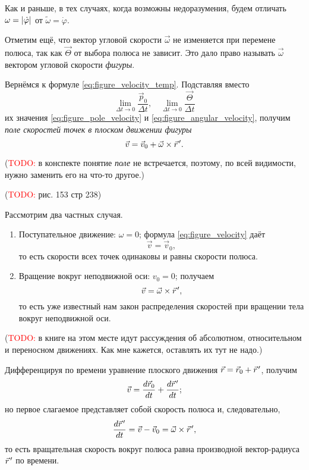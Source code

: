 Как и раньше, в тех случаях, когда возможны недоразумения, будем отличать
$\omega = \left|\dot{\varphi}\right|$ от $\tilde{\omega} = \dot{\varphi}$.

Отметим ещё, что вектор угловой скорости $\vec{\omega}$ не изменяется при
перемене полюса, так как $\vec{\Theta}$ от выбора полюса не зависит. Это дало
право называть $\vec{\omega}$ вектором угловой скорости \textit{фигуры}.

Вернёмся к формуле \ref{eq:figure_velocity_temp}. Подставляя вместо
\begin{equation*}
  \lim_{\Delta t \to 0} \frac{\vec{p}_0}{\Delta t}, \quad \lim_{\Delta t \to 0}
  \frac{\vec{\Theta}}{\Delta t}
\end{equation*}
их значения \ref{eq:figure_pole_velocity} и \ref{eq:figure_angular_velocity},
получим \textit{поле скоростей точек в плоском движении фигуры}
\begin{equation}
  \label{eq:figure_velocity}
  \vec{v} = \vec{v}_0 + \crossprod{\vec{\omega}}{\pvec{r}}.
\end{equation}

(\textcolor{red}{TODO:} в конспекте понятие \textit{поле} не встречается,
поэтому, по всей видимости, нужно заменить его на что-то другое.)

(\textcolor{red}{TODO:} рис. 153 стр 238)

Рассмотрим два частных случая.
\begin{enumerate}
  \item Поступательное движение: $\omega = 0$; формула \ref{eq:figure_velocity}
    даёт
    \begin{equation*}
      \vec{v} = \vec{v}_0,
    \end{equation*}
    то есть скорости всех точек одинаковы и равны скорости полюса.

  \item Вращение вокруг неподвижной оси: $v_0 = 0$; получаем
    \begin{equation*}
      \vec{v} = \crossprod{\vec{\omega}}{\pvec{r}},
    \end{equation*}
    то есть уже известный нам закон распределения скоростей при вращении тела
    вокруг неподвижной оси.
\end{enumerate}

(\textcolor{red}{TODO:} в книге на этом месте идут рассуждения об абсолютном,
относительном и переносном движениях. Как мне кажется, оставлять их тут не
надо.)

Дифференцируя по времени уравнение плоского движения $\vec{r} = \vec{r}_0 +
\pvec{r}$, получим
\begin{equation*}
  \vec{v} = \dt[\vec{r}_0] + \dt[\pvec{r}];
\end{equation*}
но первое слагаемое представляет собой скорость полюса и, следовательно,
\begin{equation}
  \dt[\pvec{r}] = \vec{v} - \vec{v}_0 = \crossprod{\vec{\omega}}{\pvec{r}},
\end{equation}
то есть вращательная скорость вокруг полюса равна производной вектор-радиуса
$\pvec{r}$ по времени.

